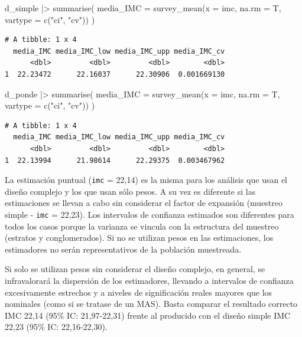 \documentclass[
  spanish,
  a4paper,
]{scrbook}
\newenvironment{Shaded}{\begin{snugshade}}{\end{snugshade}}
\newcommand{\AttributeTok}[1]{\textcolor[rgb]{0.40,0.45,0.13}{#1}}
\newcommand{\FunctionTok}[1]{\textcolor[rgb]{0.28,0.35,0.67}{#1}}
\newcommand{\NormalTok}[1]{\textcolor[rgb]{0.00,0.23,0.31}{#1}}
\newcommand{\SpecialCharTok}[1]{\textcolor[rgb]{0.37,0.37,0.37}{#1}}
\newcommand{\StringTok}[1]{\textcolor[rgb]{0.13,0.47,0.30}{#1}}
\begin{document}
\begin{Shaded}
\begin{Highlighting}[]
\NormalTok{d\_simple }\SpecialCharTok{|\textgreater{}}
  \FunctionTok{summarise}\NormalTok{(}
    \AttributeTok{media\_IMC =} \FunctionTok{survey\_mean}\NormalTok{(}\AttributeTok{x =}\NormalTok{ imc, }\AttributeTok{na.rm =}\NormalTok{ T, }\AttributeTok{vartype =} \FunctionTok{c}\NormalTok{(}\StringTok{"ci"}\NormalTok{, }\StringTok{"cv"}\NormalTok{))}
\NormalTok{  )}
\end{Highlighting}
\end{Shaded}

\begin{verbatim}
# A tibble: 1 x 4
  media_IMC media_IMC_low media_IMC_upp media_IMC_cv
      <dbl>         <dbl>         <dbl>        <dbl>
1  22.23472      22.16037      22.30906  0.001669130
\end{verbatim}

\begin{Shaded}
\begin{Highlighting}[]
\NormalTok{d\_ponde }\SpecialCharTok{|\textgreater{}}
  \FunctionTok{summarise}\NormalTok{(}
    \AttributeTok{media\_IMC =} \FunctionTok{survey\_mean}\NormalTok{(}\AttributeTok{x =}\NormalTok{ imc, }\AttributeTok{na.rm =}\NormalTok{ T, }\AttributeTok{vartype =} \FunctionTok{c}\NormalTok{(}\StringTok{"ci"}\NormalTok{, }\StringTok{"cv"}\NormalTok{))}
\NormalTok{  )}
\end{Highlighting}
\end{Shaded}

\begin{verbatim}
# A tibble: 1 x 4
  media_IMC media_IMC_low media_IMC_upp media_IMC_cv
      <dbl>         <dbl>         <dbl>        <dbl>
1  22.13994      21.98614      22.29375  0.003467962
\end{verbatim}

La estimación puntual (\texttt{imc} = 22,14) es la misma para los
análisis que usan el diseño complejo y los que usan sólo pesos. A su vez
es diferente si las estimaciones se llevan a cabo sin considerar el
factor de expansión (muestreo simple - \texttt{imc} = 22,23). Los
intervalos de confianza estimados son diferentes para todos los casos
porque la varianza se vincula con la estructura del muestreo (estratos y
conglomerados). Si no se utilizan pesos en las estimaciones, los
estimadores no serán representativos de la población muestreada.

Si solo se utilizan pesos sin considerar el diseño complejo, en general,
se infravalorará la dispersión de los estimadores, llevando a intervalos
de confianza excesivamente estrechos y a niveles de significación reales
mayores que los nominales (como si se tratase de un MAS). Basta comparar
el resultado correcto IMC 22,14 (95\% IC: 21,97-22,31) frente al
producido con el diseño simple IMC 22,23 (95\% IC: 22,16-22,30).
\end{document}
